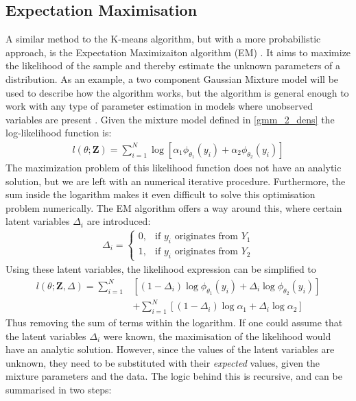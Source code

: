 \subsection{Expectation Maximisation}
A similar method to the K-means algorithm, but with a more probabilistic approach, is the Expectation Maximizaiton algorithm (EM) \parencite{Alpaydin2010}. It aims to maximize the likelihood of the sample and thereby estimate the unknown parameters of a distribution. As an example, a two component Gaussian Mixture model will be used to describe how the algorithm works, but the algorithm is general enough to work with any type of parameter estimation in models where unobserved variables are present \parencite{Hastie2001}. Given the mixture model defined in \ref{gmm_2_dens} the log-likelihood function is:
\begin{align*}
  l(\theta; \textbf{Z}) = \sum_{i=1}^{N}\operatorname{log}[\alpha_1\phi_{\theta_1}(y_i) + \alpha_2\phi_{\theta_2}(y_i)]
\end{align*}
The maximization problem of this likelihood function does not have an analytic solution, but we are left with an numerical iterative procedure. Furthermore, the sum inside the logarithm makes it even difficult to solve this optimisation problem numerically. The EM algorithm offers a way around this, where certain latent variables $\Delta_i$ are introduced:
\begin{align*}
  \Delta_i = 
  \begin{cases}
    0, & \mbox{if } y_i \mbox{ originates from } Y_1 \\
    1, & \mbox{if } y_i \mbox{ originates from } Y_2
  \end{cases}
\end{align*}
Using these latent variables, the likelihood expression can be simplified to
\begin{align*}
  l(\theta; \textbf{Z}, \Delta) = \sum_{i=1}^{N}&[(1-\Delta_i)\operatorname{log}\phi_{\theta_1}(y_i) + \Delta_i\operatorname{log}\phi_{\theta_2}(y_i)] \\
  & + \sum_{i=1}^{N}[(1-\Delta_i)\operatorname{log}\alpha_1+\Delta_i\operatorname{log}\alpha_2]
\end{align*}
Thus removing the sum of terms within the logarithm. If one could assume that the latent variables $\Delta_i$ were known, the maximisation of the likelihood would have an analytic solution. However, since the values of the latent variables are unknown, they need to be substituted with their \emph{expected} values, given the mixture parameters and the data. The logic behind this is recursive, and can be summarised in two steps:
